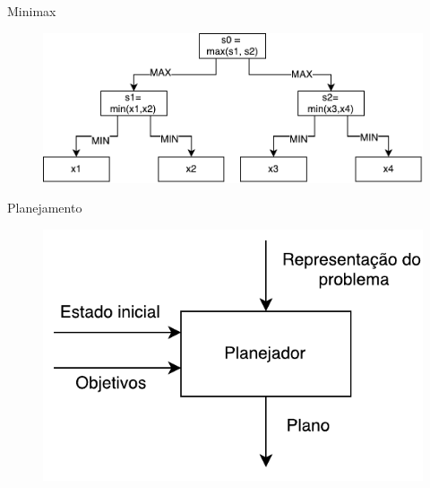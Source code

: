 \documentclass{beamer}
\begin{document}
\begin{frame}{Minimax}
	\vspace{-3mm}
	\begin{figure}[here]
		\includegraphics[width=0.8\linewidth]{fig/gametree.pdf}	
	\end{figure}	
\end{frame}

\begin{frame}{Planejamento}
	
	\vspace{-3mm}
	\begin{figure}[here]
		\includegraphics[width=0.6\linewidth]{fig/modelo.pdf}	
	\end{figure}	
\end{frame}
\end{document}
